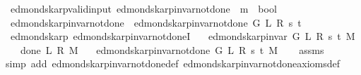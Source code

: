 \begin{isabellebody}
\isanewline
{}\isamarkupfalse%
\ {\isacharparenleft}{\kern0pt}\ edmonds{\isacharunderscore}{\kern0pt}karp{\isacharunderscore}{\kern0pt}valid{\isacharunderscore}{\kern0pt}input{\isacharparenright}{\kern0pt}\ edmonds{\isacharunderscore}{\kern0pt}karp{\isacharunderscore}{\kern0pt}invar{\isacharunderscore}{\kern0pt}not{\isacharunderscore}{\kern0pt}done{\isacharunderscore}{\kern0pt}{}{\isacharprime}{\kern0pt}{\isacharprime}{\kern0pt}\ {\isacharcolon}{\kern0pt}{\isacharcolon}{\kern0pt}\ {\isachardoublequoteopen}{\isacharprime}{\kern0pt}m\ {\isasymRightarrow}\ bool{\isachardoublequoteclose}\ \isanewline
\ \ {\isachardoublequoteopen}edmonds{\isacharunderscore}{\kern0pt}karp{\isacharunderscore}{\kern0pt}invar{\isacharunderscore}{\kern0pt}not{\isacharunderscore}{\kern0pt}done{\isacharunderscore}{\kern0pt}{}{\isacharprime}{\kern0pt}{\isacharprime}{\kern0pt}\ {\isasymequiv}\ edmonds{\isacharunderscore}{\kern0pt}karp{\isacharunderscore}{\kern0pt}invar{\isacharunderscore}{\kern0pt}not{\isacharunderscore}{\kern0pt}done{\isacharunderscore}{\kern0pt}{}{\isacharprime}{\kern0pt}\ G\ L\ R\ s\ t{\isachardoublequoteclose}\isanewline
\isanewline
{}\isamarkupfalse%
\ {\isacharparenleft}{\kern0pt}\ edmonds{\isacharunderscore}{\kern0pt}karp{\isacharparenright}{\kern0pt}\ edmonds{\isacharunderscore}{\kern0pt}karp{\isacharunderscore}{\kern0pt}invar{\isacharunderscore}{\kern0pt}not{\isacharunderscore}{\kern0pt}done{\isacharunderscore}{\kern0pt}{}I{\isacharcolon}{\kern0pt}\isanewline
\ \ \ {\isachardoublequoteopen}edmonds{\isacharunderscore}{\kern0pt}karp{\isacharunderscore}{\kern0pt}invar{\isacharprime}{\kern0pt}\ G\ L\ R\ s\ t\ M{\isachardoublequoteclose}\isanewline
\ \ \ {\isachardoublequoteopen}{\isasymnot}\ done{\isacharunderscore}{\kern0pt}{}\ L\ R\ M{\isachardoublequoteclose}\isanewline
\ \ \ {\isachardoublequoteopen}edmonds{\isacharunderscore}{\kern0pt}karp{\isacharunderscore}{\kern0pt}invar{\isacharunderscore}{\kern0pt}not{\isacharunderscore}{\kern0pt}done{\isacharunderscore}{\kern0pt}{}{\isacharprime}{\kern0pt}\ G\ L\ R\ s\ t\ M{\isachardoublequoteclose}%
\endisataginvisible
{\isafoldinvisible}%
%
\isadeliminvisible
\isanewline
%
\endisadeliminvisible
%
\isadelimproof
\ \ %
\endisadelimproof
%
\isatagproof
{}\isamarkupfalse%
\ assms\isanewline
\ \ \isamarkupfalse%
\ {\isacharparenleft}{\kern0pt}simp\ add{\isacharcolon}{\kern0pt}\ edmonds{\isacharunderscore}{\kern0pt}karp{\isacharunderscore}{\kern0pt}invar{\isacharunderscore}{\kern0pt}not{\isacharunderscore}{\kern0pt}done{\isacharunderscore}{\kern0pt}{}{\isacharunderscore}{\kern0pt}def\ edmonds{\isacharunderscore}{\kern0pt}karp{\isacharunderscore}{\kern0pt}invar{\isacharunderscore}{\kern0pt}not{\isacharunderscore}{\kern0pt}done{\isacharunderscore}{\kern0pt}{}{\isacharunderscore}{\kern0pt}axioms{\isacharunderscore}{\kern0pt}def{\isacharparenright}{\kern0pt}%

\end{isabellebody}
